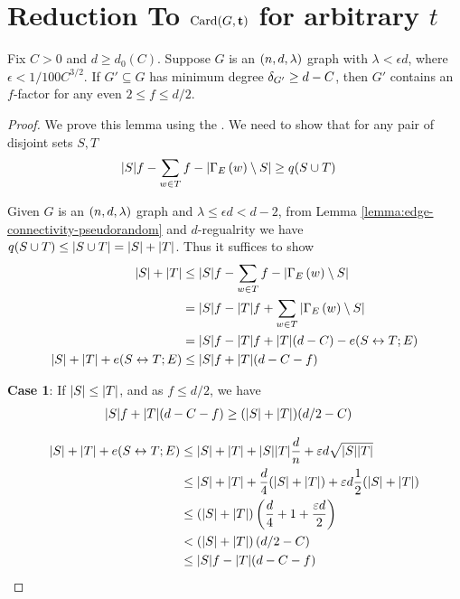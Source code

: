 \documentclass[11pt]{article}
\begin{document}
\section{Reduction To $\text{Card}(G, \mathbf{t})$ for arbitrary $t$}
\label{sec:general-result}
\begin{lemma}\label{lemma:f-factor}
  Fix $C > 0$ and $d \ge d_0(C)$.
Suppose $G$ is an $(n, d, \lambda)$ graph with $\lambda < \epsilon d$, where $\epsilon < 1/100C^{3/2}$.
If $G' \subseteq G$ has minimum degree $\delta_{G'} \ge d - C$, then $G'$ contains an $f$-factor for any even $2 \le f \le d/2$.
\end{lemma}

\begin{proof}
  We prove this lemma using the .
  We need to show that for any pair of disjoint sets $S, T$
  \begin{align}
   |S|f - \sum_{w \in T} f - |\Gamma_{E}\left(w\right) \setminus S| &\ge  q(S \cup T)
  \end{align}

  Given $G$ is an $(n, d, \lambda)$ graph and $\lambda \leq \epsilon d < d-2$, from Lemma \ref{lemma:edge-connectivity-pseudorandom} and $d$-regualrity we have  $q(S \cup T) \le |S \cup T| = |S| + |T|$.
  Thus it suffices to show
  \begin{align}
    |S| + |T| &\le |S|f - \sum_{w \in T} f - |\Gamma_{E}\left(w\right) \setminus S|   \\
              &= |S|f - |T|f + \sum_{w\in T}|\Gamma_{E}\left(w\right) \setminus S| \\
              &=|S|f - |T|f + |T|(d-C) - e(S \leftrightarrow T; E)  \\
|S| + |T| + e(S \leftrightarrow T; E) &\le  |S|f + |T|(d-C-f)  \label{eq:to-show}
  \end{align}  

  \textbf{Case 1}: If $|S| \leq |T|$, and as $f \leq d/2$, we have 
  \begin{align}
    |S|f + |T|(d-C-f)  &\ge (|S| + |T|)(d/2 -C) \label{eq:to-show-1}
  \end{align}

\begin{align}
  |S| + |T| + e(S \leftrightarrow T; E) &\le  |S| + |T| + |S||T|\frac{d}{n} + \varepsilon d \sqrt{|S||T|} \label{eq:eml}\\
                                 &\le |S| + |T| + \frac{d}{4}(|S| + |T|) + \varepsilon d \frac{1}{2}(|S| + |T|) \label{eq:algebra}\\
                                 &\le (|S| + |T|)\left(\frac{d}{4} + 1 + \frac{
                                   \varepsilon d}{2}\right) \\
                                 &<  (|S| + |T|)\left(d/2-C\right) \label{eq:eps-assumption}\\
                                 &\le |S|f - |T|(d-C-f) \label{eq:plug}
 \end{align}  
  

\end{proof}
\end{document}
